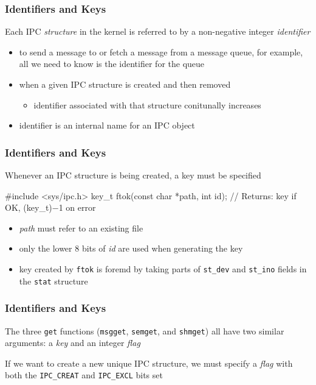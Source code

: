 \documentclass[newPxFont,sthlmFooter,nooffset]{beamer}
\begin{document}
\begin{frame}[t]
  \frametitle{Identifiers and Keys}
Each IPC \textit{structure} in the kernel is referred to by a non-negative integer \textit{identifier}
\begin{itemize}
\item to send a message to or fetch a message from a message queue, for example, all we need to know is the identifier for the queue
\item when a given IPC structure is created and then removed
  \begin{itemize}
  \item identifier associated with that structure conitunally increases
  \end{itemize}
\item identifier is an internal name for an IPC object
\end{itemize}
\end{frame}


\begin{frame}[t, fragile]
  \frametitle{Identifiers and Keys}
Whenever an IPC structure is being created, a key must be specified

\begin{codedef}
#include <sys/ipc.h>
key_t ftok(const char *path, int id);
// Returns: key if OK, (key_t)−1 on error
\end{codedef}

\begin{itemize}
\item \textit{path} must refer to an existing file
\item only the lower 8 bits of \textit{id} are used when generating the key
\item key created by \texttt{ftok} is foremd by taking parts of \texttt{st\_dev} and \texttt{st\_ino} fields in the \texttt{stat} structure
\end{itemize}

\end{frame}


\begin{frame}[t, fragile]
  \frametitle{Identifiers and Keys}
The three \texttt{get} functions (\texttt{msgget}, \texttt{semget}, and \texttt{shmget}) all have two similar arguments: a \textit{key} and an integer \textit{flag}


\bigskip
If we want to create a new unique IPC structure, we must specify a \textit{flag} with both the \texttt{IPC\_CREAT} and \texttt{IPC\_EXCL} bits set
\end{frame}
\end{document}
